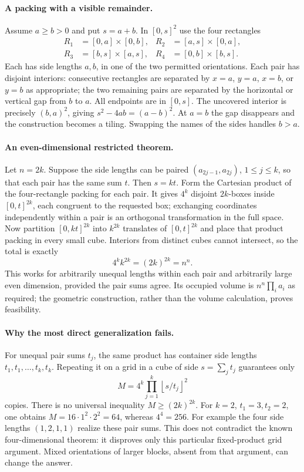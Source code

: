 \documentclass[11pt,a4paper]{article}
\begin{document}
\paragraph{A packing with a visible remainder.}
Assume $a\ge b>0$ and put $s=a+b$. In $[0,s]^2$ use the four rectangles
\[
\begin{split}
 R_1&=[0,a]\times[0,b],& R_2&=[a,s]\times[0,a],\\
 R_3&=[b,s]\times[a,s],& R_4&=[0,b]\times[b,s].
\end{split}
\]
Each has side lengths $a,b$, in one of the two permitted orientations.
Each pair has disjoint interiors: consecutive rectangles are separated by
$x=a$, $y=a$, $x=b$, or $y=b$ as appropriate; the two remaining pairs are
separated by the horizontal or vertical gap from $b$ to $a$. All endpoints
are in $[0,s]$. The uncovered interior is precisely $(b,a)^2$, giving
$s^2-4ab=(a-b)^2$. At $a=b$ the gap disappears and the construction becomes a
tiling. Swapping the names of the sides handles $b>a$.

\paragraph{An even-dimensional restricted theorem.}
Let $n=2k$. Suppose the side lengths can be paired
$(a_{2j-1},a_{2j})$, $1\le j\le k$, so that each pair has the same sum $t$.
Then $s=kt$. Form the Cartesian product of the four-rectangle packing for
each pair. It gives $4^k$ disjoint $2k$-boxes inside $[0,t]^{2k}$, each
congruent to the requested box; exchanging coordinates independently within
a pair is an orthogonal transformation in the full space.
Now partition $[0,kt]^{2k}$ into $k^{2k}$ translates of $[0,t]^{2k}$ and
place that product packing in every small cube. Interiors from distinct
cubes cannot intersect, so the total is exactly
\[
 4^k k^{2k}=(2k)^{2k}=n^n.
\]
This works for arbitrarily unequal lengths within each pair and arbitrarily
large even dimension, provided the pair sums agree. Its occupied volume is
$n^n\prod_i a_i$ as required; the geometric construction, rather than the
volume calculation, proves feasibility.

\paragraph{Why the most direct generalization fails.}
For unequal pair sums $t_j$, the same product has container side lengths
$t_1,t_1,\ldots,t_k,t_k$. Repeating it on a grid in a cube of side
$s=\sum_jt_j$ guarantees only
\[
 M=4^k\prod_{j=1}^k\left\lfloor s/t_j\right\rfloor^2
\]
copies. There is no universal inequality $M\ge (2k)^{2k}$. For $k=2$,
$t_1=3,t_2=2$, one obtains $M=16\cdot1^2\cdot2^2=64$, whereas $4^4=256$.
For example the four side lengths $(1,2,1,1)$ realize these pair sums.
This does not contradict the known four-dimensional theorem: it disproves
only this particular fixed-product grid argument. Mixed orientations of
larger blocks, absent from that argument, can change the answer.
\end{document}
